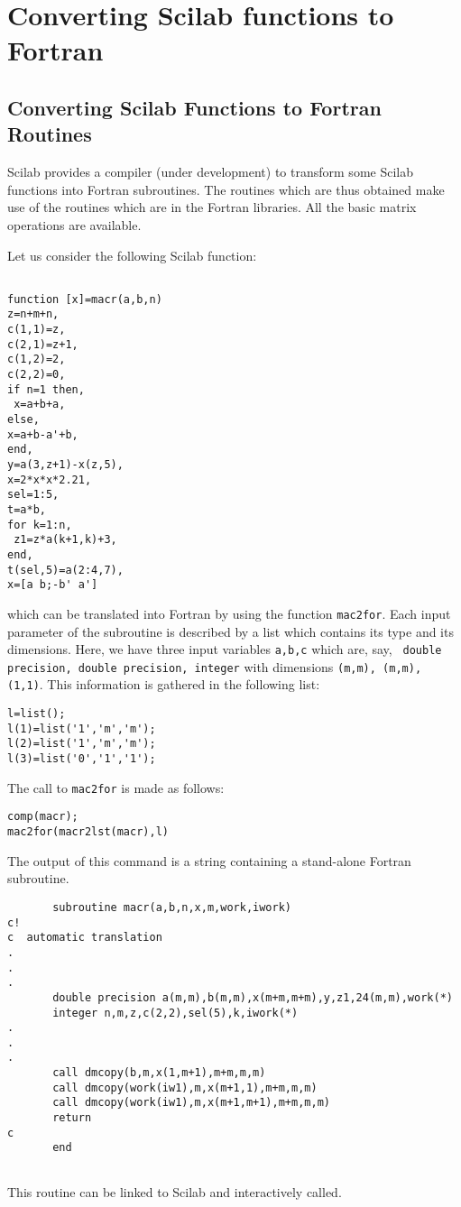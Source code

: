 \chapter{Converting Scilab functions to Fortran}

\section{Converting Scilab Functions to Fortran Routines}

Scilab provides a compiler (under development) to transform some Scilab 
functions
into Fortran subroutines. The routines which are thus obtained
make use of the routines which are in the Fortran libraries.
All the basic matrix operations are available.

Let us consider the following Scilab function:
\begin{verbatim}

function [x]=macr(a,b,n)
z=n+m+n,
c(1,1)=z,
c(2,1)=z+1,
c(1,2)=2,
c(2,2)=0,
if n=1 then,
 x=a+b+a,
else,
x=a+b-a'+b,
end,
y=a(3,z+1)-x(z,5),
x=2*x*x*2.21,
sel=1:5,
t=a*b,
for k=1:n,
 z1=z*a(k+1,k)+3,
end,
t(sel,5)=a(2:4,7),
x=[a b;-b' a']

\end{verbatim}

which can be translated into Fortran by using the function {\tt mac2for}.
Each input parameter of the subroutine is described by a list
which contains its type and its dimensions. Here, we have three
input variables {\tt a,b,c} which are, say, {\tt 
double precision, double precision, integer} with dimensions
{\tt (m,m), (m,m), (1,1)}. This information is gathered
in the following list:
\begin{verbatim}
l=list();
l(1)=list('1','m','m');
l(2)=list('1','m','m');
l(3)=list('0','1','1');
\end{verbatim}
The call to {\tt mac2for} is made as follows:
\begin{verbatim}
comp(macr);
mac2for(macr2lst(macr),l)
\end{verbatim}
The output of this command is a string containing a stand-alone Fortran 
subroutine.
\begin{verbatim}
       subroutine macr(a,b,n,x,m,work,iwork)
c!
c  automatic translation
.
.
.
       double precision a(m,m),b(m,m),x(m+m,m+m),y,z1,24(m,m),work(*)
       integer n,m,z,c(2,2),sel(5),k,iwork(*)
.
.
.      
       call dmcopy(b,m,x(1,m+1),m+m,m,m)
       call dmcopy(work(iw1),m,x(m+1,1),m+m,m,m)
       call dmcopy(work(iw1),m,x(m+1,m+1),m+m,m,m)
       return
c
       end


\end{verbatim}
This routine can be linked to Scilab and interactively called.

